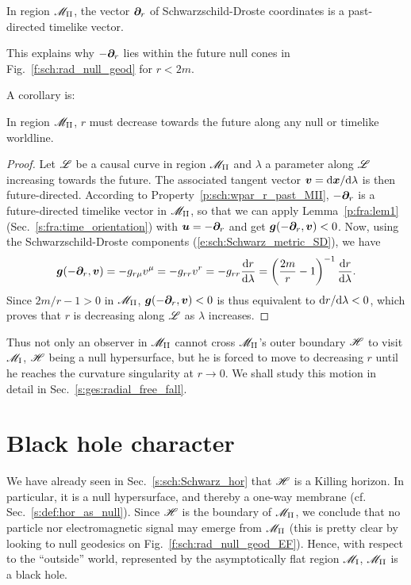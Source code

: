 \begin{prop}
\label{p:sch:wpar_r_past_MII}
In region $\mathscr{M}_{\rm II}$, the vector $\bm{\partial}_r$ of Schwarzschild-Droste coordinates
is a past-directed timelike vector.
\end{prop}
This explains why $-\bm{\partial}_r$ lies within the future null cones
in Fig.~\ref{f:sch:rad_null_geod} for $r<2m$.

A corollary is:
\begin{prop}
\label{p:sch:r_decreasing}
In region $\mathscr{M}_{\rm II}$, $r$ must decrease towards the future
along any null or timelike worldline.
\end{prop}
\begin{proof}
Let $\mathscr{L}$ be a causal curve in region $\mathscr{M}_{\rm II}$ and $\lambda$ a parameter
along $\mathscr{L}$ increasing towards the future.
The associated tangent vector
$\bm{v} = \mathrm{d}\bm{x}/\mathrm{d}\lambda$ is then future-directed.
According to Property~\ref{p:sch:wpar_r_past_MII}, $-\bm{\partial}_r$ is a future-directed timelike vector
in $\mathscr{M}_{\rm II}$, so that we can apply Lemma~\ref{p:fra:lem1} (Sec.~\ref{s:fra:time_orientation})
with $\bm{u} = - \bm{\partial}_r$ and get $\bm{g}(-\bm{\partial}_r, \bm{v}) < 0$.
Now, using the Schwarzschild-Droste
components (\ref{e:sch:Schwarz_metric_SD}), we have
\[
    \bm{g}(-\bm{\partial}_r, \bm{v}) = - g_{r\mu} v^\mu = - g_{rr} v^r = - g_{rr} \frac{\mathrm{d} r}{\mathrm{d} \lambda}
    = \left(\frac{2m}{r} - 1 \right)^{-1} \frac{\mathrm{d} r}{\mathrm{d} \lambda} .
\]
Since $2m/r - 1 > 0$ in $\mathscr{M}_{\rm II}$, $\bm{g}(-\bm{\partial}_r, \bm{v}) < 0$
is thus equivalent to $\mathrm{d} r/ \mathrm{d}\lambda < 0$, which proves that $r$ is decreasing
along $\mathscr{L}$ as $\lambda$ increases.
\end{proof}
Thus not only an observer in $\mathscr{M}_{\rm II}$ cannot cross $\mathscr{M}_{\rm II}$'s outer boundary
$\mathscr{H}$ to visit $\mathscr{M}_{\rm I}$, $\mathscr{H}$ being a null hypersurface, but he is forced
to move to decreasing $r$ until he reaches the curvature singularity at $r\rightarrow 0$.
We shall study this motion in detail in Sec.~\ref{s:ges:radial_free_fall}.



\section{Black hole character} \label{s:sch:BH}

We have already seen in Sec.~\ref{s:sch:Schwarz_hor} that $\mathscr{H}$ is
a Killing horizon. In particular, it is a null hypersurface, and thereby a
one-way membrane (cf. Sec.~\ref{s:def:hor_as_null}).
Since $\mathscr{H}$ is the boundary of $\mathscr{M}_{\rm II}$, we conclude that no particle nor
electromagnetic signal may emerge from $\mathscr{M}_{\rm II}$
(this is pretty clear by looking to null geodesics on
Fig.~\ref{f:sch:rad_null_geod_EF}). Hence, with respect to the ``outside''
world, represented by the asymptotically flat region $\mathscr{M}_{\rm I}$,
$\mathscr{M}_{\rm II}$ is a black hole.


